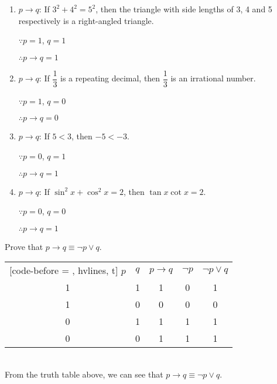 \documentclass{report}
\newcounter{example}
\begin{document}
\begin{solution}
    \item \begin{enumerate}[label=(\alph*), leftmargin=*]
        \item $p \rightarrow q$: If $3^2 + 4^2 = 5^2$, then the triangle with side lengths of 3, 4 and 5 respectively is a right-angled triangle.

              $\because p = 1$, $q = 1$

              $\therefore p \rightarrow q = 1$

        \item $p \rightarrow q$: If $\dfrac{1}{3}$ is a repeating decimal, then $\dfrac{1}{3}$ is an irrational number.

              $\because p = 1$, $q = 0$

              $\therefore p \rightarrow q = 0$

        \item $p \rightarrow q$: If $5 < 3$, then $-5 < -3$.

              $\because p = 0$, $q = 1$

              $\therefore p \rightarrow q = 1$

        \item $p \rightarrow q$: If $\sin^2 x + \cos^2 x = 2$, then $\tan x \cot x = 2$.

              $\because p = 0$, $q = 0$

              $\therefore p \rightarrow q = 1$
    \end{enumerate}
\end{solution}
\vspace{0.1cm}
\begin{example}
    \item Prove that $p \rightarrow q \equiv \neg p \lor q$.
\end{example}
\begin{solution}
    \item \begin{NiceTabular}{|c|c|c|c|c|}[code-before = , hvlines, t]
        $p$ & $q$ & $p \rightarrow q$ & $\neg p$ & $\neg p \lor q$ \\
        1   & 1   & 1                 & 0        & 1               \\
        1   & 0   & 0                 & 0        & 0               \\
        0   & 1   & 1                 & 1        & 1               \\
        0   & 0   & 1                 & 1        & 1               \\
    \end{NiceTabular}\\

    From the truth table above, we can see that $p \rightarrow q \equiv \neg p \lor
        q$.
\end{solution}
\end{document}

